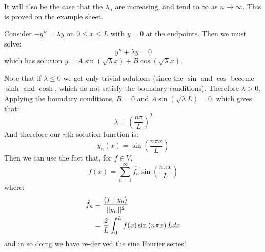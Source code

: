 \documentclass[../Main.tex]{subfiles}
\begin{document}
It will also be the case that the $\lambda_n$ are increasing, and tend to $\infty$ as $n \to \infty$. This is proved on the example sheet.

\begin{example}
    Consider $-y'' = \lambda y$ on $0 \leq x \leq L$ with $y = 0$ at the endpoints. Then we must solve:
    \begin{equation*}
        y'' + \lambda y = 0
    \end{equation*}
    which has solution $y = A\sin(\sqrt{\lambda} x) + B\cos(\sqrt{\lambda} x)$.

    Note that if $\lambda \leq 0$ we get only trivial solutions (since the $\sin$ and $\cos$ become $\sinh$ and $\cosh$, which do not satisfy the boundary conditions). Therefore $\lambda > 0$. Applying the boundary conditions, $B = 0$ and $A\sin(\sqrt{\lambda} L) = 0$, which gives that:
    \begin{equation*}
        \lambda = \left(\frac{n\pi}{L}\right)^2
    \end{equation*}
    And therefore our $n$th solution function is:
    \begin{equation*}
        y_n(x) = \sin\left(\frac{n\pi x}{L}\right)
    \end{equation*}
    Then we can use the fact that, for $f \in V$,
    \begin{equation*}
        f(x) = \sum_{n = 1}^\infty \hat{f_n}\sin\left(\frac{n\pi x}{L}\right) 
    \end{equation*}
    where:
    \begin{align*}
        \hat{f}_n &= \frac{\langle f~\vert~y_n\rangle}{||y_n||^2} \\
        &=\frac{2}{L} \int_{0}^{L} f(x) \sin\left(n\pi x\right)L dx 
    \end{align*}
    and in so doing we have re-derived the sine Fourier series!
\end{example}
\end{document}
